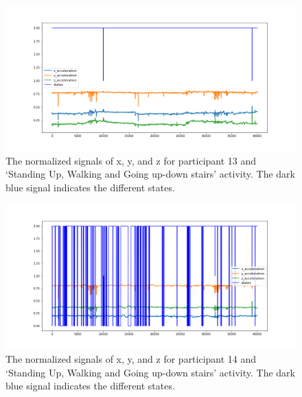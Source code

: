 \begin{figure}[H]
    \centering
    \begin{minipage}[b]{1\textwidth}
        \includegraphics[width=\textwidth]{manuscript/src/figures/Ass3/Ass3_Q2_states_user_12N.png}
    \end{minipage}
    \caption{The normalized signals of x, y, and z for participant 13 and ‘Standing  Up,  Walking  and  Going  up-down  stairs’ activity. The dark blue signal indicates the different states.}
    \label{fig:Ass3_Q2_states_user_12N}
\end{figure}
\begin{figure}[H]
    \centering
    \begin{minipage}[b]{1\textwidth}
        \includegraphics[width=\textwidth]{manuscript/src/figures/Ass3/Ass3_Q2_states_user_13N.png}
    \end{minipage}
    \caption{The normalized signals of x, y, and z for participant 14 and ‘Standing  Up,  Walking  and  Going  up-down  stairs’ activity. The dark blue signal indicates the different states.}
    \label{fig:Ass3_Q2_states_user_13N}
\end{figure}
